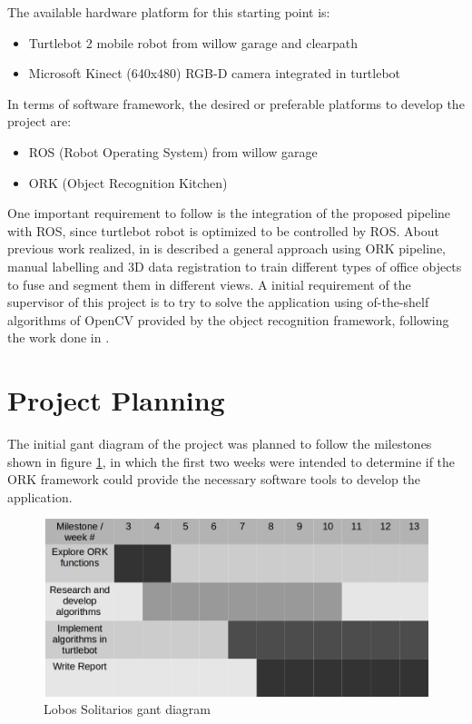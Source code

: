 \documentclass[fontsize=12pt]{article}
\begin{document}
The available hardware platform for this starting point is:
\begin{itemize}
\item Turtlebot 2 mobile robot from willow garage and clearpath
\item Microsoft Kinect (640x480) RGB-D camera integrated in turtlebot
\end{itemize}
In terms of software framework, the desired or preferable platforms to develop the project are:
\begin{itemize}
\item ROS (Robot Operating System) from willow garage
\item ORK (Object Recognition Kitchen)\cite{bib:ORK}
\end{itemize}
One important requirement to follow is the integration of the proposed pipeline with ROS, since turtlebot robot is optimized to be controlled by ROS.
About previous work realized, in \cite{bib:semantic} is described a general approach using ORK pipeline, manual labelling and 3D data registration to train different types of office objects to fuse and segment them in different views.  \linebreak
A initial requirement of the supervisor of this project is to try to solve the application using of-the-shelf algorithms of OpenCV \cite{bib:OCV} provided by the object recognition framework, following the work done in \cite{bib:semantic}.
\section{Project Planning}
\label{sec:pplanning}
The initial gant diagram of the project was planned to follow the milestones shown in figure \ref{fig:plan1}, in which the first two weeks were intended to determine if the ORK framework could provide the necessary software tools to develop the application.
\begin{figure}[H]
\begin{center}
\includegraphics[width=0.8\linewidth]{images/plan1}
\caption{Lobos Solitarios gant diagram}
\label{fig:plan1}
\end{center}
\end{figure}
\end{document}
